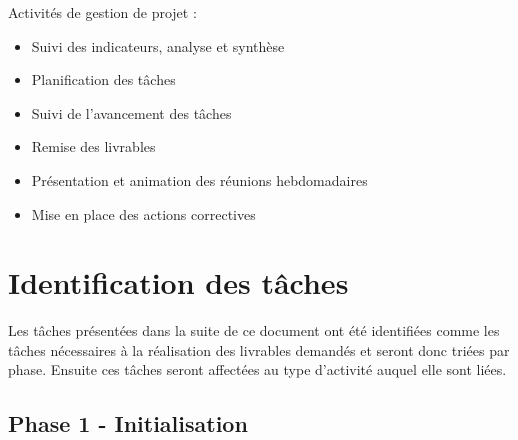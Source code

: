 Activités de gestion de projet : \\

\begin{itemize}
    \item[\textbullet] Suivi des indicateurs, analyse et synthèse
    \item[\textbullet] Planification des tâches
    \item[\textbullet] Suivi de l’avancement des tâches
    \item[\textbullet] Remise des livrables
    \item[\textbullet] Présentation et animation des réunions hebdomadaires
    \item[\textbullet] Mise en place des actions correctives \\
\end{itemize}

\section{Identification des tâches}

Les tâches présentées dans la suite de ce document ont été identifiées comme les tâches nécessaires à la réalisation des livrables demandés et seront donc triées par phase. Ensuite ces tâches seront affectées au type d’activité auquel elle sont liées.  

\subsection{Phase 1 - Initialisation}

